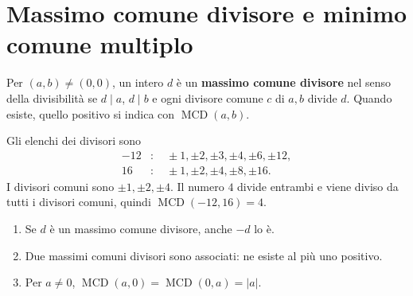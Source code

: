 \begin{schema}
\end{schema}

\section{Massimo comune divisore e minimo comune multiplo}
\begin{definizione}
Per $(a,b)\ne(0,0)$, un intero $d$ è un \textbf{massimo comune divisore} nel senso della divisibilità se $d\mid a$, $d\mid b$ e ogni divisore comune $c$ di $a,b$ divide $d$. Quando esiste, quello positivo si indica con $\operatorname{MCD}(a,b)$.
\end{definizione}

\begin{esempio}
Gli elenchi dei divisori sono
\[
\begin{aligned}
-12&:\quad \pm1,\pm2,\pm3,\pm4,\pm6,\pm12,\\
16&:\quad \pm1,\pm2,\pm4,\pm8,\pm16.
\end{aligned}
\]
I divisori comuni sono $\pm1,\pm2,\pm4$. Il numero $4$ divide entrambi e viene diviso da tutti i divisori comuni, quindi $\operatorname{MCD}(-12,16)=4$.
\end{esempio}

\begin{proposizione}
\begin{enumerate}[label=\arabic*.]
\item Se $d$ è un massimo comune divisore, anche $-d$ lo è.
\item Due massimi comuni divisori sono associati: ne esiste al più uno positivo.
\item Per $a\ne0$, $\operatorname{MCD}(a,0)=\operatorname{MCD}(0,a)=|a|$.
\end{enumerate}
\end{proposizione}

